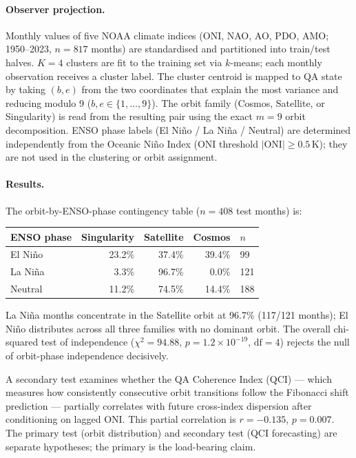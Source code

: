 \documentclass[11pt]{article}
\begin{document}
\paragraph{Observer projection.}
Monthly values of five NOAA climate indices (ONI, NAO, AO, PDO, AMO; 1950--2023,
$n = 817$ months) are standardised and partitioned into train/test halves.
$K=4$ clusters are fit to the training set via $k$-means; each monthly observation
receives a cluster label.  The cluster centroid is mapped to QA state by taking
$(b,e)$ from the two coordinates that explain the most variance and reducing
modulo 9 ($b,e \in \{1,\dots,9\}$).  The orbit family (Cosmos, Satellite, or
Singularity) is read from the resulting pair using the exact $m=9$ orbit decomposition.
ENSO phase labels (El Ni\~no / La Ni\~na / Neutral) are determined independently
from the Oceanic Ni\~no Index (ONI threshold $|\text{ONI}| \geq 0.5$\,K);
they are not used in the clustering or orbit assignment.

\paragraph{Results.}
The orbit-by-ENSO-phase contingency table ($n=408$ test months) is:

\begin{center}
\small
\begin{tabular}{lrrrl}
\toprule
\textbf{ENSO phase} & \textbf{Singularity} & \textbf{Satellite} & \textbf{Cosmos} & $n$ \\
\midrule
El Ni\~no  & 23.2\% & 37.4\% & 39.4\% & 99 \\
La Ni\~na  &  3.3\% & 96.7\% &  0.0\% & 121 \\
Neutral    & 11.2\% & 74.5\% & 14.4\% & 188 \\
\bottomrule
\end{tabular}
\end{center}

La Ni\~na months concentrate in the Satellite orbit at 96.7\% (117/121 months);
El Ni\~no distributes across all three families with no dominant orbit.
The overall chi-squared test of independence ($\chi^2 = 94.88$, $p = 1.2 \times 10^{-19}$,
$\text{df} = 4$) rejects the null of orbit-phase independence decisively.

A secondary test examines whether the QA Coherence Index (QCI) --- which measures
how consistently consecutive orbit transitions follow the Fibonacci shift prediction ---
partially correlates with future cross-index dispersion after conditioning on lagged ONI.
This partial correlation is $r = -0.135$, $p = 0.007$.
The primary test (orbit distribution) and secondary test (QCI forecasting) are
separate hypotheses; the primary is the load-bearing claim.
\end{document}
